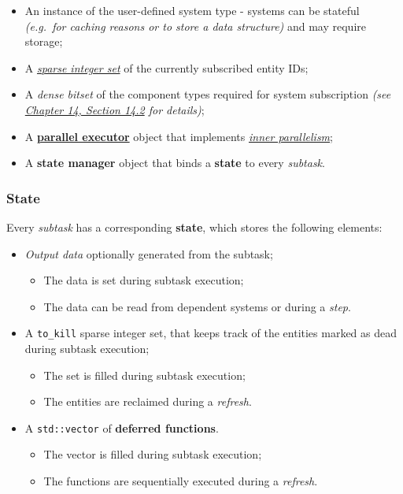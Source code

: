 \documentclass[oneside, 12pt, a4paper, openany]{book}
\begin{document}
\begin{itemize}
\item
  An instance of the user-defined system type - systems can be stateful
  \emph{(e.g.~for caching reasons or to store a data structure)} and may
  require storage;
\item
  A \protect\hyperlink{appendix_sparse_integer_sets}{\emph{sparse
  integer set}} of the currently subscribed entity IDs;
\item
  A \emph{dense bitset} of the component types required for system
  subscription \emph{(see
  \protect\hyperlink{appendix_component_bitset_creation}{Chapter 14,
  Section 14.2} for details)};
\item
  A \protect\hyperlink{multithreading_par_executor}{\textbf{parallel
  executor}} object that implements
  \protect\hyperlink{multithreading_inner_par}{\emph{inner
  parallelism}};
\item
  A \textbf{state manager} object that binds a \textbf{state} to every
  \emph{subtask}.
\end{itemize}

\hypertarget{storage_state}{\subsubsection{State}\label{storage_state}}

Every \emph{subtask} has a corresponding \textbf{state}, which stores
the following elements:

\begin{itemize}
\item
  \emph{Output data} optionally generated from the subtask;

  \begin{itemize}
  \item
    The data is set during subtask execution;
  \item
    The data can be read from dependent systems or during a \emph{step}.
  \end{itemize}
\item
  A
  \texttt{to_kill}
  sparse integer set, that keeps track of the entities marked as dead
  during subtask execution;

  \begin{itemize}
  \item
    The set is filled during subtask execution;
  \item
    The entities are reclaimed during a \emph{refresh}.
  \end{itemize}
\item
  A
  \texttt{std::vector}
  of \textbf{deferred functions}.

  \begin{itemize}
  \item
    The vector is filled during subtask execution;
  \item
    The functions are sequentially executed during a \emph{refresh}.
  \end{itemize}
\end{itemize}
\end{document}
